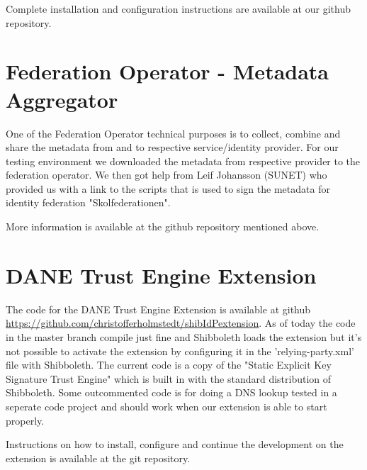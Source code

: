 Complete installation and configuration instructions are available at our github repository.

\section{Federation Operator - Metadata Aggregator}
One of the Federation Operator technical purposes is to collect, combine and share the metadata from and to respective service/identity provider.
For our testing environment we downloaded the metadata from respective provider to the federation operator.
We then got help from Leif Johansson (SUNET) who provided us with a link to the scripts that is used to sign the metadata for identity federation "Skolfederationen".

More information is available at the github repository mentioned above.

\section{DANE Trust Engine Extension}
The code for the DANE Trust Engine Extension is available at github \url{https://github.com/christofferholmstedt/shibIdPextension}.
As of today the code in the master branch compile just fine and Shibboleth loads the extension but it's not possible to activate the extension by configuring it in the 'relying-party.xml' file with Shibboleth.
The current code is a copy of the "Static Explicit Key Signature Trust Engine" which is built in with the standard distribution of Shibboleth.
Some outcommented code is for doing a DNS lookup tested in a seperate code project and should work when our extension is able to start properly.

Instructions on how to install, configure and continue the development on the extension is available at the git repository. 

